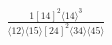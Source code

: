 \documentclass[varwidth, border=5pt]{standalone}
\begin{document}
\begin{my}
$\begin{gathered}
\scriptscriptstyle\frac{1[14]^2⟨14⟩^3}{⟨12⟩⟨15⟩[24]^2⟨34⟩⟨45⟩}
\end{gathered}$
\end{my}
\end{document}
